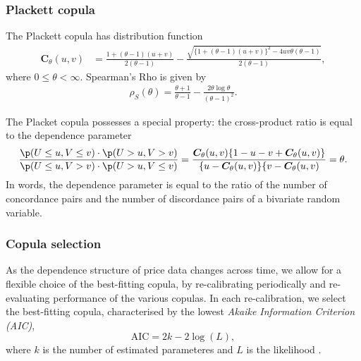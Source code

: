 \subsubsection{Plackett copula}\label{subsec:other-copula}
The Plackett copula has distribution function
\begin{align*}
    \bm{C}_{\theta}(u,v) &= \frac{1+(\theta-1)(u+v)}{2(\theta-1)}
                         - \frac{\sqrt{\{
    1+(\theta-1)(u+v)\}^2 - 4uv\theta(\theta-1)}}{2(\theta-1)},
\end{align*} where $0 \leq \theta < \infty$.
Spearman's Rho is given by 
\begin{align*}
    \rho_S(\theta) = \frac{\theta+1}{\theta-1} - \frac{2\theta \log
  \theta}{(\theta-1)^2}. 
    \end{align*}

The Placket copula possesses a special property:
the cross-product ratio is equal to the dependence parameter
\begin{equation} \label{eq:PlackettCrossProduct}
    \frac{\p(U \leq u, V \leq v) \cdot \p(U > u, V > v)}
    {\p(U \leq u, V > v) \cdot \p(U > u, V \leq v)}\nonumber
    =
      \frac{\bm{C}_\theta(u,v)\{1-u-v+\bm{C}_\theta(u,v)\}}{\{u-\bm{C}_\theta(u,v)\}\{v-\bm{C}_\theta(u,v)}\nonumber 
    = \theta.
\end{equation}
In words, the dependence parameter is equal to the ratio of the 
number of concordance pairs and the number of discordance pairs of a 
bivariate random variable. 



\subsubsection{Copula selection}\label{subsec:copula-selection}
As the dependence structure of price data changes
across time, we allow for a flexible choice of the best-fitting
copula, by re-calibrating periodically and re-evaluating performance
of the various copulas. 
In each re-calibration, we select the best-fitting
copula, characterised by the lowest {\em Akaike Information Criterion
  (AIC)},
\begin{equation*}
 \text{AIC} = 2k- 2 \log(L),
\end{equation*}
where $k$ is the number of estimated
parameteres and $L$ is the likelihood \citep{Akaike1973}. 

